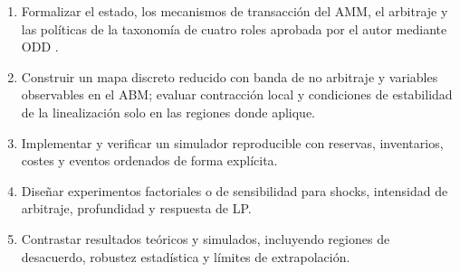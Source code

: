 \begin{enumerate}
  \item Formalizar el estado, los mecanismos de transacción del AMM, el arbitraje y las
    políticas de la taxonomía de cuatro roles aprobada por el autor mediante ODD \cite{grimm2020odd}.
  \item Construir un mapa discreto reducido con banda de no arbitraje y variables
    observables en el ABM; evaluar contracción local y condiciones de estabilidad de la
    linealización solo en las regiones donde aplique.
  \item Implementar y verificar un simulador reproducible con reservas, inventarios,
    costes y eventos ordenados de forma explícita.
  \item Diseñar experimentos factoriales o de sensibilidad para shocks, intensidad de
    arbitraje, profundidad y respuesta de LP.
  \item Contrastar resultados teóricos y simulados, incluyendo regiones de desacuerdo,
    robustez estadística y límites de extrapolación.
\end{enumerate}
